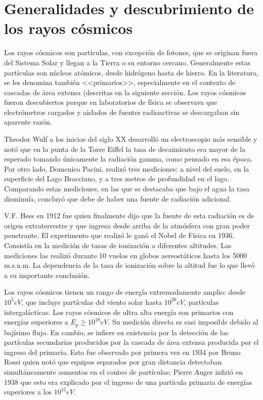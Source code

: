 \documentclass{book}
\begin{document}

\section{Generalidades y descubrimiento de los rayos c\'osmicos}
Los rayos c\'osmicos son part\'iculas, con excepci\'on de fotones, que se originan fuera del Sistema Solar y llegan a la Tierra o su entorno cercano. Generalmente estas part\'iculas son n\'ucleos at\'omicos, desde hidr\'ogeno hasta de hierro. En la literatura, se les denomina tambi\'en <<primarios>>, especialmente en el contexto de cascadas de \'area extensa (descritas en la siguiente secci\'on. Los rayos c\'osmicos fueron descubiertos porque en laboratorios de f\'isica se observava que electr\'ometros cargados y aislados de fuentes radioactivas se descargaban sin aparente raz\'on. \citep{ASOREY}

Theodor Wulf a los inicios del siglo XX desarroll\'o un electroscopio m\'as sensible y not\'o que en la punta de la Torre Eiffel la tasa de decaimiento era mayor de la esperado tomando \'unicamente la radiaci\'on gamma, como pensado en esa \'epoca. Por otro lado, Domenico Pacini, realiz\'o tres mediciones: a nivel del suelo, en la superficie del Lago Bracciano, y a tres metros de profundidad en el lago. Comparando estas mediciones, en las que se destacaba que bajo el agua la tasa disminu\'ia, concluy\'o que debe de haber una fuente de radiaci\'on adicional. \citep{ASOREY}

V.F. Hess en 1912 fue quien finalmente dijo que la fuente de esta radiaci\'on es de origen extraterrestre y que ingresa desde arriba de la atm\'osfera con gran poder penetrante. El experimento que realiz\'o le gan\'o el Nobel de F\'isica en 1936. Consist\'ia en la medici\'on de tasas de ionizaci\'on a diferentes altitudes. Las mediciones las realiz\'o durante 10 vuelos en globos aereost\'aticos hasta los 5000 m.s.n.m. La dependencia de la tasa de ionizaci\'on sobre la altitud fue lo que llev\'o a su importante conclusi\'on. \citep{ASOREY}

Los rayos c\'osmicos tienen un rango de energ\'ia extremadamente amplio: desde $10^5 eV$, que incluye part\'iculas del viento solar hasta $10^20 eV$, part\'iculas intergal\'acticas. Los rayos c\'osmicos de ultra alta energ\'ia son primarios con energ\'ias superiores a $E_p \geq 10^18 eV$. Su medici\'on directa es casi imposible debido al baj\'isimo flujo. En cambio, se infiere su existencia por la detecci\'on de las part\'iculas secundarias producidos por la cascada de \'area extensa producida por el ingreso del primario. Esto fue observado por primera vez en 1934 por Bruno Rossi quien not\'o que equipos separados por gran distancia detectaban simult\'aneamente aumentos en el conteo de part\'iculas; Pierre Auger infiri\'o en 1938 que esto era explicado por el ingreso de una part\'icula primaria de energ\'ias superiores a los $10^15 eV$. \citep{ASOREY}
\end{document}
